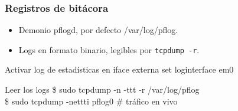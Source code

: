 \documentclass{beamer}
\begin{document}

\begin{frame}
\frametitle{Registros de bitácora}

\begin{itemize}
\item Demonio pflogd, por defecto /var/log/pflog. 
\item Logs en formato binario, legibles por \texttt{tcpdump -r}.
\end{itemize}

\begin{block}{Activar log de estadísticas en iface externa}
set loginterface em0
\end{block}

\begin{block}{Leer los logs}
\$ sudo tcpdump -n -ttt -r /var/log/pflog \\
\$ sudo tcpdump -nettti pflog0  \hspace{4mm} \# tráfico en vivo 
\end{block}


\end{frame}

\end{document}
